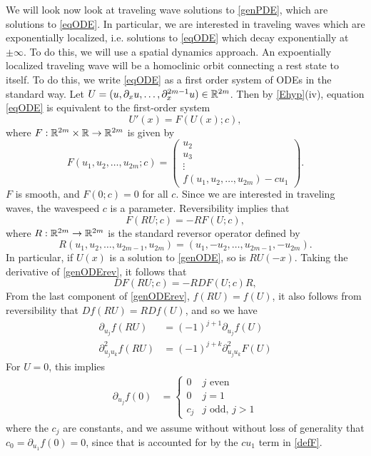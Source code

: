 \documentclass[thesis.tex]{subfiles}
\begin{document}
We will look now look at traveling wave solutions to \cref{genPDE}, which are solutions to \cref{eqODE}. In particular, we are interested in traveling waves which are exponentially localized, i.e. solutions to \cref{eqODE} which decay exponentially at $\pm \infty$. To do this, we will use a spatial dynamics approach. An expoentially localized traveling wave will be a homoclinic orbit connecting a rest state to itself. To do this, we write \cref{eqODE} as a first order system of ODEs in the standard way. Let $U = (u, \partial_x u, \dots, \partial_x^{2m-1} u) \in \mathbb{R}^{2m}$. Then by \cref{Ehyp}(iv), equation \cref{eqODE} is equivalent to the first-order system
\begin{equation}\label{genODE}
U'(x) = F(U(x); c),
\end{equation}
where $F: \mathbb{R}^{2m} \times \mathbb{R} \rightarrow \mathbb{R}^{2m}$ is given by
\begin{equation}\label{defF}
F(u_1, u_2, \dots, u_{2m}; c) = 
\begin{pmatrix}
u_2 \\ u_3 \\ \vdots \\ f(u_1, u_2, \dots, u_{2m}) - c u_1
\end{pmatrix}.
\end{equation}
$F$ is smooth, and $F(0; c) = 0$ for all $c$. Since we are interested in traveling waves, the wavespeed $c$ is a parameter. Reversibility implies that
\begin{equation}\label{genODErev}
F(RU; c) = -RF(U; c),
\end{equation}
where $R:\mathbb{R}^{2m} \rightarrow \mathbb{R}^{2m}$ is the standard reversor operator defined by
\begin{equation}\label{reverserR2m}
R(u_1, u_2, \dots, u_{2m-1}, u_{2m}) = (u_1, -u_2, \dots, u_{2m-1}, -u_{2m}).
\end{equation}
In particular, if $U(x)$ is a solution to \cref{genODE}, so is $RU(-x)$. Taking the derivative of \ref{genODErev}, it follows that 
\begin{equation}\label{genODErevDF}
D F(RU; c) = -RDF(U; c)R,
\end{equation}
From the last component of \eqref{genODErev}, $f(RU) = f(U)$, it also follows from reversibility that $Df(RU) = RDf(U)$, and so we have
\begin{equation}\label{frev}
\begin{aligned}
\partial_{u_j} f(R U) &= (-1)^{j+1} \partial_{u_j} f(U) \\
\partial^2_{u_j u_k} f(R U) &= (-1)^{j+k} \partial^2_{u_j u_k} F(U)
\end{aligned}
\end{equation}
For $U = 0$, this implies
\begin{align}\label{fpartials0}
\partial_{u_j} f(0) &= \begin{cases}
0 & j \text{ even}\\
0 & j = 1 \\
c_j & j \text{ odd, } j > 1
\end{cases}
\end{align}
where the $c_j$ are constants, and we assume without without loss of generality that $c_0 = \partial_{u_1} f(0) = 0$, since that is accounted for by the $c u_1$ term in \cref{defF}.
\end{document}

